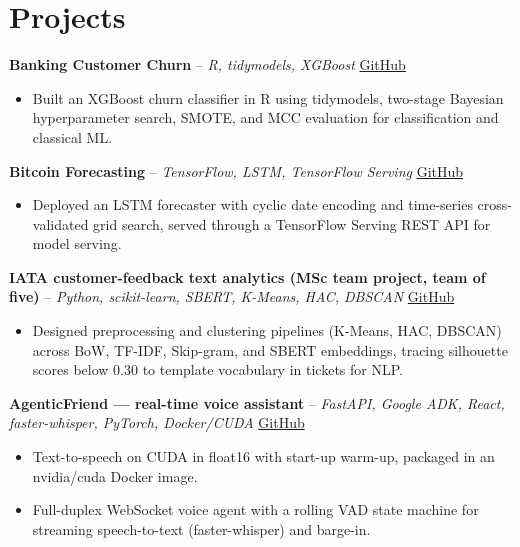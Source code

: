 \documentclass[a4paper,11pt]{article}
\begin{document}
\section{Projects}
\noindent\textbf{Banking Customer Churn} -- \textit{R, tidymodels, XGBoost} \hfill \href{https://github.com/Thiruvel-AP/Banking-Customer-Churn-Prediction}{GitHub}
\begin{itemize}
  \item Built an XGBoost churn classifier in R using tidymodels, two-stage Bayesian hyperparameter search, SMOTE, and MCC evaluation for classification and classical ML.
\end{itemize}
\vspace{3pt}
\noindent\textbf{Bitcoin Forecasting} -- \textit{TensorFlow, LSTM, TensorFlow Serving} \hfill \href{https://github.com/Thiruvel-AP/BitcoinForecasting}{GitHub}
\begin{itemize}
  \item Deployed an LSTM forecaster with cyclic date encoding and time-series cross-validated grid search, served through a TensorFlow Serving REST API for model serving.
\end{itemize}
\vspace{3pt}
\noindent\textbf{IATA customer-feedback text analytics (MSc team project, team of five)} -- \textit{Python, scikit-learn, SBERT, K-Means, HAC, DBSCAN} \hfill \href{https://github.com/Thiruvel-AP/TextAnalytics}{GitHub}
\begin{itemize}
  \item Designed preprocessing and clustering pipelines (K-Means, HAC, DBSCAN) across BoW, TF-IDF, Skip-gram, and SBERT embeddings, tracing silhouette scores below 0.30 to template vocabulary in tickets for NLP.
\end{itemize}
\vspace{3pt}
\noindent\textbf{AgenticFriend — real-time voice assistant} -- \textit{FastAPI, Google ADK, React, faster-whisper, PyTorch, Docker/CUDA} \hfill \href{https://github.com/Thiruvel-AP/adk_multi-agent}{GitHub}
\begin{itemize}
  \item Text-to-speech on CUDA in float16 with start-up warm-up, packaged in an nvidia/cuda Docker image.
  \item Full-duplex WebSocket voice agent with a rolling VAD state machine for streaming speech-to-text (faster-whisper) and barge-in.
\end{itemize}
\end{document}
